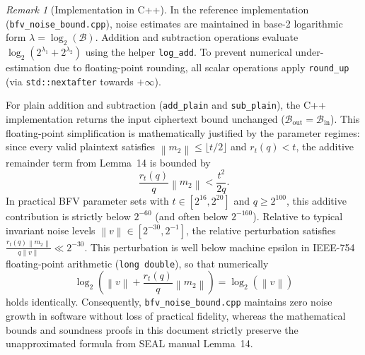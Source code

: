 \documentclass[11pt]{article}
\theoremstyle{definition}
\theoremstyle{remark}
\newtheorem{remark}{Remark}
\newcommand{\norm}[1]{\left\lVert #1\right\rVert}
\begin{document}
\begin{remark}[Implementation in C++]\label{rem:cpp_impl}
In the reference implementation (\texttt{bfv\_noise\_bound.cpp}), noise estimates are maintained in base-2 logarithmic form $\lambda = \log_2(\mathcal{B})$.
Addition and subtraction operations evaluate $\log_2(2^{\lambda_1} + 2^{\lambda_2})$ using the helper \texttt{log\_add}.
To prevent numerical under-estimation due to floating-point rounding, all scalar operations apply \texttt{round\_up} (via \texttt{std::nextafter} towards $+\infty$).

For plain addition and subtraction (\texttt{add\_plain} and \texttt{sub\_plain}), the C++ implementation returns the input ciphertext bound unchanged ($\mathcal{B}_{\mathrm{out}} = \mathcal{B}_{\mathrm{in}}$).
This floating-point simplification is mathematically justified by the parameter regimes: since every valid plaintext satisfies $\norm{m_2} \leq \lfloor t/2 \rfloor$ and $r_t(q) < t$, the additive remainder term from Lemma~14 is bounded by
\[
  \frac{r_t(q)}{q}\norm{m_2} < \frac{t^2}{2q}.
\]
In practical BFV parameter sets with $t \in [2^{16}, 2^{20}]$ and $q \geq 2^{100}$, this additive contribution is strictly below $2^{-60}$ (and often below $2^{-160}$).
Relative to typical invariant noise levels $\norm{v} \in [2^{-30}, 2^{-1}]$, the relative perturbation satisfies
$\frac{r_t(q)\norm{m_2}}{q\norm{v}} \ll 2^{-30}$.
This perturbation is well below machine epsilon in IEEE-754 floating-point arithmetic (\texttt{long double}), so that numerically
\[
  \log_2\left(\norm{v} + \frac{r_t(q)}{q}\norm{m_2}\right) = \log_2(\norm{v})
\]
holds identically.
Consequently, \texttt{bfv\_noise\_bound.cpp} maintains zero noise growth in software without loss of practical fidelity, whereas the mathematical bounds and soundness proofs in this document strictly preserve the unapproximated formula from SEAL manual Lemma~14.
\end{remark}
\end{document}
